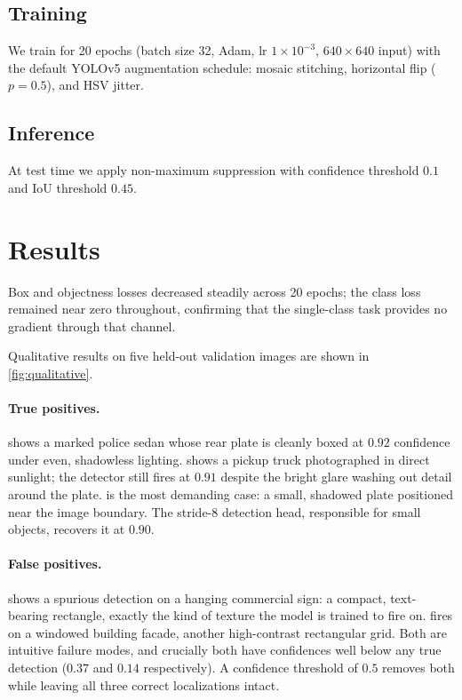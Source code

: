 \documentclass[times,10pt,twocolumn]{article}
\begin{document}
\subsection{Training}
\label{sec:training}
We train for 20 epochs (batch size 32, Adam, lr $1\!\times\!10^{-3}$,
$640\!\times\!640$ input) with the default YOLOv5 augmentation schedule:
mosaic stitching, horizontal flip ($p=0.5$), and HSV jitter.

\subsection{Inference}
\label{sec:inference}
At test time we apply non-maximum suppression with confidence threshold
$0.1$ and IoU threshold $0.45$.

\section{Results}
\label{sec:results}

Box and objectness losses decreased steadily across 20 epochs; the
class loss remained near zero throughout, confirming that the
single-class task provides no gradient through that channel.

Qualitative results on five held-out validation images are shown in
\cref{fig:qualitative}.

\paragraph{True positives.}
 shows a marked police sedan whose rear plate is cleanly
boxed at $0.92$ confidence under even, shadowless lighting.
 shows a pickup truck photographed in direct sunlight;
the detector still fires at $0.91$ despite the bright glare washing out
detail around the plate.  is the most demanding case: a
small, shadowed plate positioned near the image boundary. The stride-8
detection head, responsible for small objects, recovers it at $0.90$.

\paragraph{False positives.}
 shows a spurious detection on a hanging commercial
sign: a compact, text-bearing rectangle, exactly the kind of texture
the model is trained to fire on.  fires on a windowed
building facade, another high-contrast rectangular grid. Both are
intuitive failure modes, and crucially both have confidences well below
any true detection ($0.37$ and $0.14$ respectively). A confidence
threshold of $0.5$ removes both while leaving all three correct
localizations intact.
\end{document}
